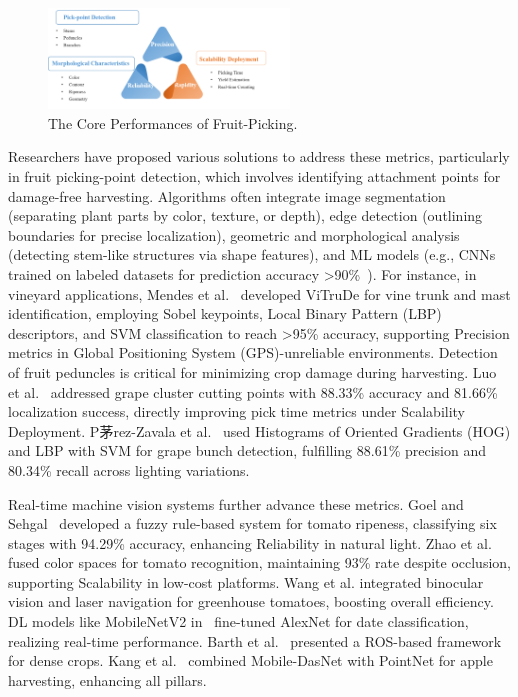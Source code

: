 \documentclass[a4paper,fleqn]{cas-dc}
\begin{document}
\begin{figure}[hbtp]
\centering
\includegraphics[width=0.57\textwidth]{fig_performance.png}
\caption{The Core Performances of Fruit-Picking.}
\label{fig:performance}
\end{figure}

Researchers have proposed various solutions to address these metrics, particularly in fruit picking-point detection, which involves identifying attachment points for damage-free harvesting. Algorithms often integrate image segmentation (separating plant parts by color, texture, or depth), edge detection (outlining boundaries for precise localization), geometric and morphological analysis (detecting stem-like structures via shape features), and ML models (e.g., CNNs trained on labeled datasets for prediction accuracy >90\%~\cite{mendes2016vine}).
For instance, in vineyard applications, Mendes et al.~\cite{mendes2016vine} developed ViTruDe for vine trunk and mast identification, employing Sobel keypoints, Local Binary Pattern (LBP) descriptors, and SVM classification to reach >95\% accuracy, supporting Precision metrics in  Global Positioning System (GPS)-unreliable environments.
Detection of fruit peduncles is critical for minimizing crop damage during harvesting. 
Luo et al.~\cite{luo2018vision} addressed grape cluster cutting points with 88.33\% accuracy and 81.66\% localization success, directly improving pick time metrics under Scalability Deployment.
P茅rez-Zavala et al.~\cite{perez2018pattern} used Histograms of Oriented Gradients (HOG) and LBP with SVM for grape bunch detection, fulfilling 88.61\% precision and 80.34\% recall across lighting variations.

Real-time machine vision systems further advance these metrics. 
Goel and Sehgal~\cite{goel2015fuzzy} developed a fuzzy rule-based system for tomato ripeness, classifying six stages with 94.29\% accuracy, enhancing Reliability in natural light. 
Zhao et al.~\cite{zhao2016robust} fused color spaces for tomato recognition, maintaining 93\% rate despite occlusion, supporting Scalability in low-cost platforms.
Wang et al.\cite{lili2017development} integrated binocular vision and laser navigation for greenhouse tomatoes, boosting overall efficiency.
DL models like MobileNetV2 in~\cite{altaheri2019date} fine-tuned AlexNet for date classification, realizing real-time performance. 
Barth et al.~\cite{barth2016design} presented a ROS-based framework for dense crops.
Kang et al.~\cite{kang2020real}  combined Mobile-DasNet with PointNet for apple harvesting, enhancing all pillars.
\end{document}

